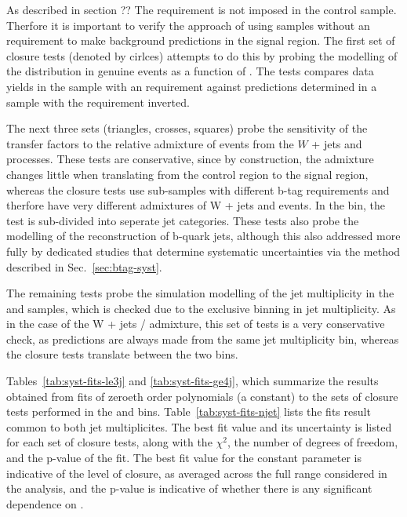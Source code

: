 As described in section ?? The \alphat requirement is not imposed 
in the \mj control sample. Therfore it is important to verify the 
approach of using \mj samples without an \alphat requirement to 
make background predictions in the signal region.  The first set of
closure tests (denoted by cirlces) attempts to do this by probing
the modelling of the \alphat distribution in genuine \met events as a
function of \scalht.  The tests compares data yields in the \mj
sample with an \alphat requirement against predictions determined in a
\mj sample with the \alphat requirement inverted. 

The next three sets (triangles, crosses, squares) probe the
sensitivity of the transfer factors to the relative admixture of
events from the $W$ + jets and \ttbar processes. These tests are
conservative, since by construction, the admixture changes little when
translating from the \mj control region to the signal region, whereas the 
closure tests use sub-samples with different b-tag requirements and 
therfore have very different admixtures of W + jets and \ttbar events.  
In the \njetlow bin, the test is sub-divided into seperate jet categories.
These tests also probe the modelling of the reconstruction of b-quark jets, 
although this also addressed more fully by dedicated studies that 
determine systematic uncertainties via the method described in
Sec.~\ref{sec:btag-syst}.

The remaining tests probe the simulation modelling of
the jet multiplicity in the \mj and \gj samples, which is checked due 
to the exclusive binning in jet multiplicity. As in the case of the 
W + jets / \ttbar admixture, this set of tests  is a very conservative
 check, as predictions are always made from the same jet multiplicity bin,
whereas the closure tests translate between the two bins.

Tables~\ref{tab:syst-fits-le3j} and \ref{tab:syst-fits-ge4j}, which
summarize the results obtained from fits of zeroeth order polynomials
(\ie a constant) to the sets of closure tests performed in the \njetlow 
and \njethigh bins.  Table~\ref{tab:syst-fits-njet} lists the fits result
common to both jet multiplicites. The best fit value and its uncertainty
is listed for each set of closure tests, along with the $\chi^{2}$, the number
of degrees of freedom, and the p-value of the fit. The best fit value
for the constant parameter is indicative of the level of closure, as
averaged across the full \scalht range considered in the analysis, and
the p-value is indicative of whether there is any significant
dependence on \scalht. 

